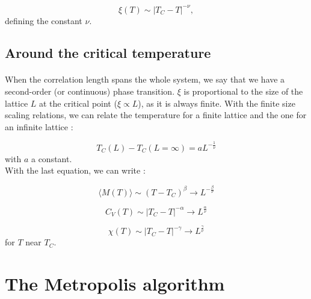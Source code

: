 \documentclass[a4paper, twoside, 11pt]{report}
\theoremstyle{theorem}
\theoremstyle{remark}
\theoremstyle{exemple}
\begin{document}
                \begin{equation*}
                    \xi (T) \sim |T_C - T |^{-\nu},
                \end{equation*}
            defining the constant $\nu$.
            
        \subsection{Around the critical temperature}            
            
            \paragraph{}When the correlation length spans the whole system, we say that we have a second-order (or continuous) phase transition. $\xi$ is proportional to the size of the lattice $L$ at the critical point ($\xi \propto L$), as it is always finite. With the finite size scaling relations, we can relate the temperature for a finite lattice and the one for an infinite lattice :
            
                \begin{equation*}
                    T_C(L) - T_C (L=\infty) = aL^{-\frac{1}{\nu}}
                \end{equation*}
            with $a$ a constant.\\
            With the last equation, we can write :
            
                \begin{equation*}
                    \langle M(T) \rangle \sim (T-T_C)^{\beta} \rightarrow L^{-\frac{\beta}{\nu}}
                \end{equation*}
                
                \begin{equation*}
                    C_V(T) \sim |T_C -T|^{-\alpha} \rightarrow L^{\frac{\alpha}{\nu}}
                \end{equation*}
                
                \begin{equation*}
                    \chi(T) \sim |T_C - T|^{-\gamma} \rightarrow L^{\frac{\gamma}{\nu}}
                \end{equation*}
            for $T$ near $T_C$.
    
    
    \section{The Metropolis algorithm}
        
\end{document}
